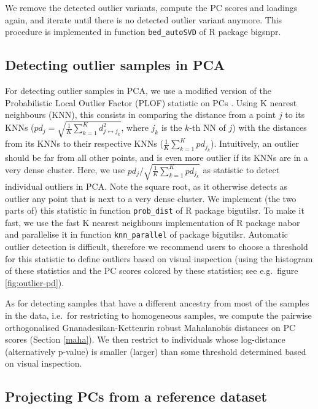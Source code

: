 \documentclass{bioinfo}
\begin{document}
\begin{methods}
We remove the detected outlier variants, compute the PC scores and loadings again, and iterate until there is no detected outlier variant anymore.
This procedure is implemented in function \texttt{bed\_autoSVD} of R package bigsnpr.

\subsection{Detecting outlier samples in PCA \label{outlier-sample}}

For detecting outlier samples in PCA, we use a modified version of the Probabilistic Local Outlier Factor (PLOF) statistic on PCs \cite[]{kriegel2009loop}. Using K nearest neighbours (KNN), this consists in comparing the distance from a point $j$ to its KNNs ($pd_j = \sqrt{\frac{1}{K} \sum_{k=1}^K d^2_{j \leftrightarrow j_k}}$, where $j_k$ is the $k$-th NN of $j$) with the distances from its KNNs to their respective KNNs ($\frac{1}{K} \sum_{k=1}^K pd_{j_k}$). Intuitively, an outlier should be far from all other points, and is even more outlier if its KNNs are in a very dense cluster. 
Here, we use $pd_j / \sqrt{\frac{1}{K} \sum_{k=1}^K pd_{j_k}}$ as statistic to detect individual outliers in PCA. Note the square root, as it otherwise detects as outlier any point that is next to a very dense cluster.
We implement (the two parts of) this statistic in function \texttt{prob\_dist} of R package bigutilsr. To make it fast, we use the fast K nearest neighbours implementation of R package nabor \cite[]{elseberg2012comparison} and parallelise it in function \texttt{knn\_parallel} of package bigutilsr.
Automatic outlier detection is difficult, therefore we recommend users to choose a threshold for this statistic to define outliers based on visual inspection (using the histogram of these statistics and the PC scores colored by these statistics; see e.g.\ figure \ref{fig:outlier-pd}).
 
As for detecting samples that have a different ancestry from most of the samples in the data, i.e.\ for restricting to homogeneous samples, we compute the pairwise orthogonalised Gnanadesikan-Kettenrin robust Mahalanobis distances on PC scores (Section \ref{maha}). We then restrict to individuals whose log-distance (alternatively p-value) is smaller (larger) than some threshold determined based on visual inspection.


\subsection{Projecting PCs from a reference dataset \label{proj}}


\end{methods}
\end{document}
